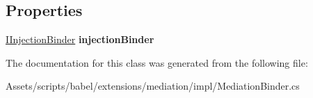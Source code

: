 \subsection*{Properties}
\begin{DoxyCompactItemize}
\item 
\hypertarget{classbabel_1_1extensions_1_1mediation_1_1impl_1_1_mediation_binder_a6cc1bf7f3a8206ae04dc1c2fcf23cf9e}{\hyperlink{interfacebabel_1_1extensions_1_1injector_1_1api_1_1_i_injection_binder}{I\-Injection\-Binder} {\bfseries injection\-Binder}}\label{classbabel_1_1extensions_1_1mediation_1_1impl_1_1_mediation_binder_a6cc1bf7f3a8206ae04dc1c2fcf23cf9e}

\end{DoxyCompactItemize}


The documentation for this class was generated from the following file\-:\begin{DoxyCompactItemize}
\item 
Assets/scripts/babel/extensions/mediation/impl/Mediation\-Binder.\-cs\end{DoxyCompactItemize}
